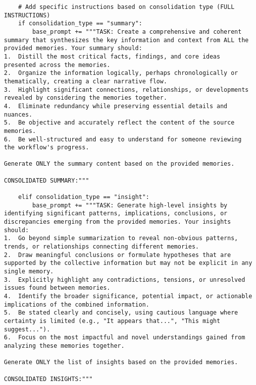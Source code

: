\documentclass[12pt,a4paper]{article}
\begin{document}
\begin{pageablecode}
\begin{verbatim}
    # Add specific instructions based on consolidation type (FULL INSTRUCTIONS)
    if consolidation_type == "summary":
        base_prompt += """TASK: Create a comprehensive and coherent summary that synthesizes the key information and context from ALL the provided memories. Your summary should:
1.  Distill the most critical facts, findings, and core ideas presented across the memories.
2.  Organize the information logically, perhaps chronologically or thematically, creating a clear narrative flow.
3.  Highlight significant connections, relationships, or developments revealed by considering the memories together.
4.  Eliminate redundancy while preserving essential details and nuances.
5.  Be objective and accurately reflect the content of the source memories.
6.  Be well-structured and easy to understand for someone reviewing the workflow's progress.

Generate ONLY the summary content based on the provided memories.

CONSOLIDATED SUMMARY:"""

    elif consolidation_type == "insight":
        base_prompt += """TASK: Generate high-level insights by identifying significant patterns, implications, conclusions, or discrepancies emerging from the provided memories. Your insights should:
1.  Go beyond simple summarization to reveal non-obvious patterns, trends, or relationships connecting different memories.
2.  Draw meaningful conclusions or formulate hypotheses that are supported by the collective information but may not be explicit in any single memory.
3.  Explicitly highlight any contradictions, tensions, or unresolved issues found between memories.
4.  Identify the broader significance, potential impact, or actionable implications of the combined information.
5.  Be stated clearly and concisely, using cautious language where certainty is limited (e.g., "It appears that...", "This might suggest...").
6.  Focus on the most impactful and novel understandings gained from analyzing these memories together.

Generate ONLY the list of insights based on the provided memories.

CONSOLIDATED INSIGHTS:"""


\end{verbatim}
\end{pageablecode}
\end{document}
